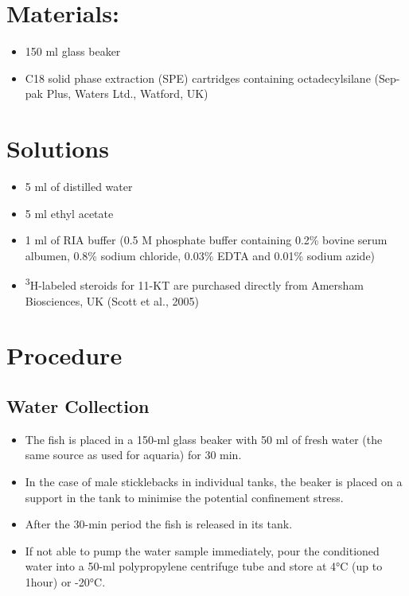 \documentclass[
  letterpaper,
  DIV=11,
  numbers=noendperiod]{scrreprt}
\providecommand{\tightlist}{%
  \setlength{\itemsep}{0pt}\setlength{\parskip}{0pt}}\usepackage{longtable,booktabs,array}
\begin{document}
\hypertarget{materials}{%
\section{Materials:}\label{materials}}

\begin{itemize}
\tightlist
\item
  150 ml glass beaker
\item
  C18 solid phase extraction (SPE) cartridges containing octadecylsilane
  (Sep-pak Plus, Waters Ltd., Watford, UK)
\end{itemize}

\hypertarget{solutions-71}{%
\section{Solutions}\label{solutions-71}}

\begin{itemize}
\tightlist
\item
  5 ml of distilled water
\item
  5 ml ethyl acetate
\item
  1 ml of RIA buffer (0.5 M phosphate buffer containing 0.2\% bovine
  serum albumen, 0.8\% sodium chloride, 0.03\% EDTA and 0.01\% sodium
  azide)
\item
  \textsuperscript{3}H-labeled steroids for 11-KT are purchased directly
  from Amersham Biosciences, UK (Scott et al., 2005)
\end{itemize}

\hypertarget{procedure-78}{%
\section{Procedure}\label{procedure-78}}

\hypertarget{water-collection}{%
\subsection{Water Collection}\label{water-collection}}

\begin{itemize}
\tightlist
\item
  The fish is placed in a 150-ml glass beaker with 50 ml of fresh water
  (the same source as used for aquaria) for 30 min.
\item
  In the case of male sticklebacks in individual tanks, the beaker is
  placed on a support in the tank to minimise the potential confinement
  stress.
\item
  After the 30-min period the fish is released in its tank.
\item
  If not able to pump the water sample immediately, pour the conditioned
  water into a 50-ml polypropylene centrifuge tube and store at 4°C (up
  to 1hour) or -20°C.
\end{itemize}
\end{document}
